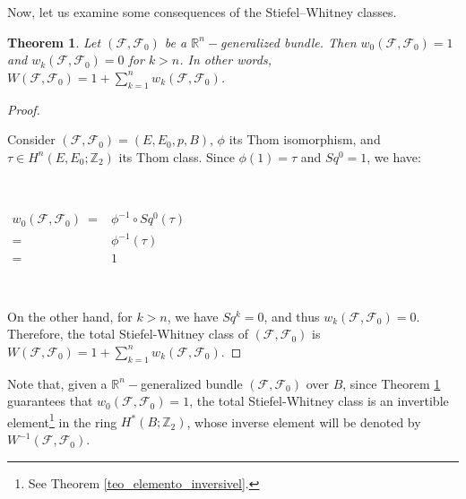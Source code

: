\documentclass[12pt,oneside]{book}
\newtheorem{teo}    {Theorem}[chapter]
\newcommand{\ds}{\displaystyle}
\newcommand{\R}{\mathbb{R}}
\newcommand{\Z}{\mathbb{Z}}
\begin{document}
    Now, let us examine some consequences of the Stiefel–Whitney classes.

    \begin{teo}\label{res_SW_fht_1}
	Let $(\mathcal{F},\mathcal{F}_{0})$ be a $\R^{n}-$generalized bundle. Then $w_{0}(\mathcal{F},\mathcal{F}_{0})=1$ and 
    $w_{k}(\mathcal{F},\mathcal{F}_{0})=0$ for $k>n$. In other words, 
    $W(\mathcal{F},\mathcal{F}_{0})=1+\ds\sum_{k=1}^{n}w_{k}(\mathcal{F},\mathcal{F}_{0})$.
    \end{teo}

    \begin{proof}
    
        \

        Consider $(\mathcal{F},\mathcal{F}_{0})=(E,E_{0},p,B)$, $\phi$ its Thom isomorphism, and $\tau\in H^{n}(E,E_{0};\Z_{2})$ its Thom 
        class. Since $\phi(1)=\tau$ and $Sq^{0}=1$, we have:

        \

        $\begin{array}{rl}
        	w_{0}(\mathcal{F},\mathcal{F}_{0}) \ = & \phi^{-1}\circ Sq^{0}(\tau) \\
        	= & \phi^{-1}(\tau) \\
        	= & 1
        \end{array}$

        \

        On the other hand, for $k>n$, we have $Sq^{k}=0$, and thus $w_{k}(\mathcal{F},\mathcal{F}_{0})=0$. Therefore, the total 
        Stiefel-Whitney class of $(\mathcal{F},\mathcal{F}_{0})$ is 
        $W(\mathcal{F},\mathcal{F}_{0})=1+\ds\sum_{k=1}^{n}w_{k}(\mathcal{F},\mathcal{F}_{0})$.

    \end{proof}

    Note that, given a $\R^{n}-$generalized bundle $(\mathcal{F},\mathcal{F}_{0})$ over $B$, since Theorem \ref{res_SW_fht_1} guarantees 
    that $w_{0}(\mathcal{F},\mathcal{F}_{0})=1$, the total Stiefel-Whitney class is an invertible 
    element\footnote{See Theorem \ref{teo_elemento_inversivel}.} in the ring $H^{*}(B;\Z_{2})$, whose inverse element will be denoted by 
    $W^{-1}(\mathcal{F},\mathcal{F}_{0})$.
\end{document}
